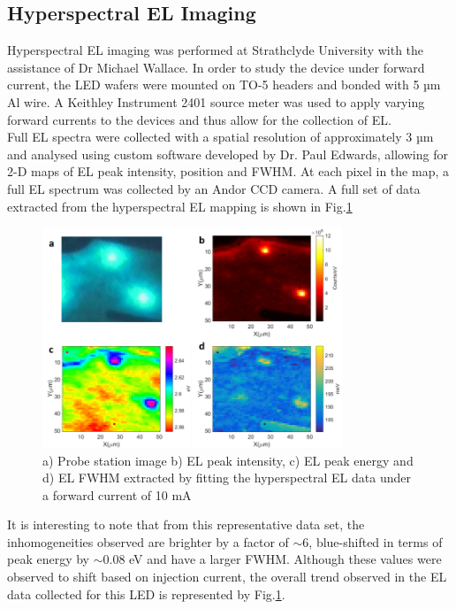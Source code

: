 \subsection{Hyperspectral EL Imaging}
Hyperspectral EL imaging was performed at Strathclyde University with the assistance of Dr Michael Wallace. In order to study the device under forward current, the LED wafers were mounted on TO-5 headers and bonded with 5 µm Al wire. A Keithley Instrument 2401 source meter was used to apply varying forward currents to the devices and thus allow for the collection of EL. \\
Full EL spectra were collected with a spatial resolution of approximately 3 µm and analysed using custom software developed by Dr. Paul Edwards, allowing for 2-D maps of EL peak intensity, position and FWHM. At each pixel in the map, a full EL spectrum was collected by an Andor CCD camera. A full set of data extracted from the hyperspectral EL mapping is shown in Fig.\ref{ELfull}

\begin{figure}[!ht]
	\centering
	\includegraphics[width=0.8\textwidth]{Figs/Ch3/ELfull}
	\caption[h] {a) Probe station image b) EL peak intensity, c) EL peak energy and d) EL FWHM extracted by fitting the hyperspectral EL data under a forward current of 10 mA}
	\label{ELfull}
\end{figure}

\FloatBarrier 

It is interesting to note that from this representative data set, the inhomogeneities observed are brighter by a factor of $\sim 6$, blue-shifted in terms of peak energy by $\sim 0.08$ eV and have a larger FWHM. Although these values were observed to shift based on injection current, the overall trend observed in the EL data collected for this LED is represented by Fig.\ref{ELfull}.

